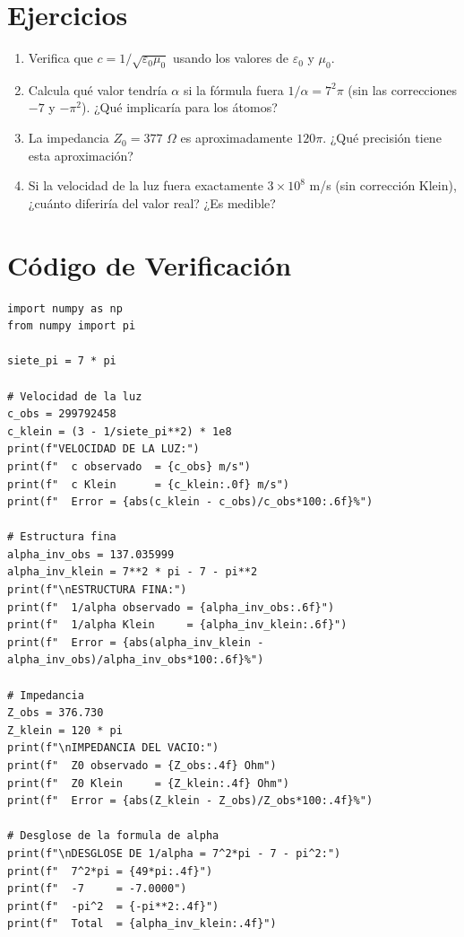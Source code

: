 \section*{Ejercicios}

\begin{enumerate}
    \item Verifica que $c = 1/\sqrt{\varepsilon_0\mu_0}$ usando los valores de $\varepsilon_0$ y $\mu_0$.

    \item Calcula qué valor tendría $\alpha$ si la fórmula fuera $1/\alpha = 7^2\pi$ (sin las
    correcciones $-7$ y $-\pi^2$). ¿Qué implicaría para los átomos?

    \item La impedancia $Z_0 = 377$ $\Omega$ es aproximadamente $120\pi$.
    ¿Qué precisión tiene esta aproximación?

    \item Si la velocidad de la luz fuera exactamente $3 \times 10^8$ m/s (sin corrección
    Klein), ¿cuánto diferiría del valor real? ¿Es medible?
\end{enumerate}


\section*{Código de Verificación}

\begin{lstlisting}[caption={Verificación numérica - Capítulo 3}]
import numpy as np
from numpy import pi

siete_pi = 7 * pi

# Velocidad de la luz
c_obs = 299792458
c_klein = (3 - 1/siete_pi**2) * 1e8
print(f"VELOCIDAD DE LA LUZ:")
print(f"  c observado  = {c_obs} m/s")
print(f"  c Klein      = {c_klein:.0f} m/s")
print(f"  Error = {abs(c_klein - c_obs)/c_obs*100:.6f}%")

# Estructura fina
alpha_inv_obs = 137.035999
alpha_inv_klein = 7**2 * pi - 7 - pi**2
print(f"\nESTRUCTURA FINA:")
print(f"  1/alpha observado = {alpha_inv_obs:.6f}")
print(f"  1/alpha Klein     = {alpha_inv_klein:.6f}")
print(f"  Error = {abs(alpha_inv_klein - alpha_inv_obs)/alpha_inv_obs*100:.6f}%")

# Impedancia
Z_obs = 376.730
Z_klein = 120 * pi
print(f"\nIMPEDANCIA DEL VACIO:")
print(f"  Z0 observado = {Z_obs:.4f} Ohm")
print(f"  Z0 Klein     = {Z_klein:.4f} Ohm")
print(f"  Error = {abs(Z_klein - Z_obs)/Z_obs*100:.4f}%")

# Desglose de la formula de alpha
print(f"\nDESGLOSE DE 1/alpha = 7^2*pi - 7 - pi^2:")
print(f"  7^2*pi = {49*pi:.4f}")
print(f"  -7     = -7.0000")
print(f"  -pi^2  = {-pi**2:.4f}")
print(f"  Total  = {alpha_inv_klein:.4f}")
\end{lstlisting}
